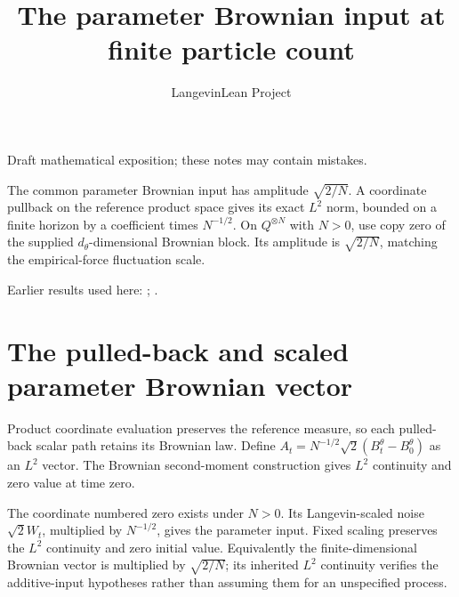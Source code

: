 \documentclass[11pt,a4paper]{article}
\title{\texorpdfstring{The parameter Brownian input at finite particle count}{The parameter Brownian input at finite particle count}}
\author{LangevinLean Project}
\date{}
\begin{document}
\maketitle
Draft mathematical exposition; these notes may contain mistakes.


The common parameter Brownian input has amplitude \(\sqrt{2/N}\). A coordinate pullback on the reference product space gives its exact \(L^2\) norm, bounded on a finite horizon by a coefficient times \(N^{-1/2}\). On \(Q^{\otimes N}\) with \(N>0\), use copy zero of the supplied \(d_\theta\)-dimensional Brownian block. Its amplitude is \(\sqrt{2/N}\), matching the empirical-force fluctuation scale.



Earlier results used here: \cite[Section~3.32]{LangevinLean2026ULASC}; \cite[Section~3.8]{LangevinLean2026ULASC}.

\section{\texorpdfstring{The pulled-back and scaled parameter Brownian vector}{The pulled-back and scaled parameter Brownian vector}}


Product coordinate evaluation preserves the reference measure, so each pulled-back scalar path retains its Brownian law. Define \(A_t=N^{-1/2}\sqrt2(B_t^\theta-B_0^\theta)\) as an \(L^2\) vector. The Brownian second-moment construction gives \(L^2\) continuity and zero value at time zero.



The coordinate numbered zero exists under \(N>0\). Its Langevin-scaled noise \(\sqrt2W_t\), multiplied by \(N^{-1/2}\), gives the parameter input. Fixed scaling preserves the \(L^2\) continuity and zero initial value. Equivalently the finite-dimensional Brownian vector is multiplied by \(\sqrt{2/N}\); its inherited \(L^2\) continuity verifies the additive-input hypotheses rather than assuming them for an unspecified process.
\end{document}
